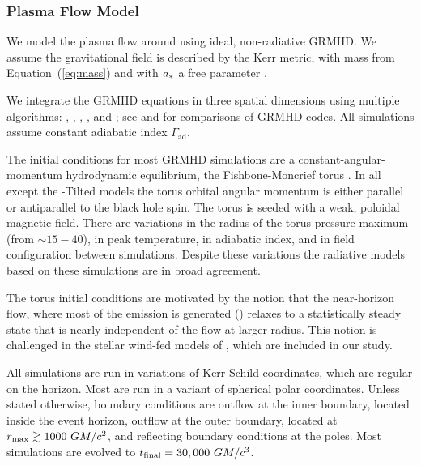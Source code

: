 \subsubsection{Plasma Flow Model}

We model the plasma flow around \sgra using ideal, non-radiative GRMHD.  We assume the gravitational field
is described by the Kerr metric, with mass from Equation~(\ref{eq:mass}) and with $a_*$ a free parameter \citep[see e.g.,][]{1999ApJ...522..727K,2003ApJ...589..444G, 2003ApJ...589..458D, 2005ApJ...635..723A, 2007A&A...473...11D}.

We integrate the GRMHD equations in three spatial dimensions using multiple algorithms:
\kharma   \citep{2021JOSS....6.3336P},
\bhac     \citep{2017ComAC...4....1P},
\hamr     \citep{Liska2019},
\koral    \citep{2013MNRAS.429.3533S}, and
\athenapp \citep{2016ApJS..225...22W};
see \citet{2019ApJS..243...26P} and \citet{Olivares_et_al} for comparisons of GRMHD codes.
All simulations assume constant adiabatic index  $\Gamma_\mathrm{ad}$.

The initial conditions for most GRMHD simulations  are a constant-angular-momentum hydrodynamic equilibrium, the Fishbone-Moncrief torus \citep{1976ApJ...207..962F}.  In all except the \hamr-Tilted models the torus orbital angular momentum is either parallel or antiparallel to the black hole spin.  The torus is seeded with a weak, poloidal magnetic field.  There are variations in the radius of the torus pressure maximum (from $\sim 15-40$), in peak temperature, in  adiabatic index, and in field configuration between simulations.  Despite these variations the radiative models based on these simulations are in broad agreement.   

The torus initial conditions are motivated by the notion that the near-horizon flow, where most of the emission is generated () relaxes to a statistically steady state that is nearly independent of the flow at larger radius.  This notion is challenged in the stellar wind-fed models of \cite{2020ApJ...896L...6R}, which are included in our study.

All simulations are run in variations of Kerr-Schild coordinates, which are regular on the horizon.
Most are run in a variant of spherical polar coordinates.
Unless stated otherwise, boundary conditions are outflow at the inner boundary, located inside the event horizon, outflow at the outer boundary, located at $r_{\rm max} \gtrsim 1000~GM/c^2$, and reflecting boundary conditions at the poles.
Most simulations are evolved to $t_\mathrm{final} = 30,000~GM/c^3$.

